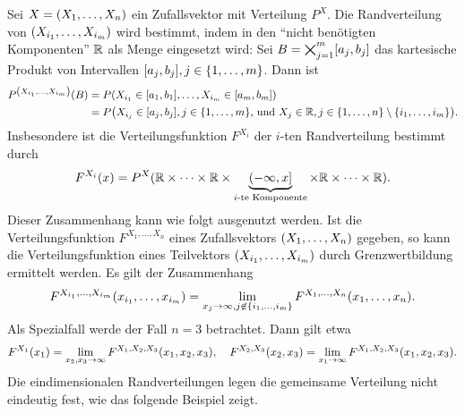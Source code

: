 \documentclass{lecture}
\begin{document}
    Sei \(X = \parentheses*{X_1, \ldots, X_n}\) ein Zufallsvektor mit Verteilung \(P^X\).
    Die Randverteilung von \(\parentheses*{X_{i_1}, \ldots, X_{i_m}}\) wird bestimmt, indem in den ``nicht benötigten Komponenten'' \(\R\) als Menge eingesetzt wird:
    Sei \(B = \bigtimes_{j = 1}^m \brackets*{a_j, b_j}\) das kartesische Produkt von Intervallen \(\brackets*{a_j, b_j}, j \in \braces*{1, \ldots, m}\).
    Dann ist
    \begin{align*}
        P^{\parentheses*{X_{i_1}, \ldots, X_{i_m}}}\parentheses*{B} &= P\parentheses*{X_{i_1} \in \brackets*{a_1, b_1}, \ldots, X_{i_m} \in \brackets*{a_m, b_m}}\\
        &= P\parentheses*{X_{i_j} \in \brackets*{a_j, b_j}, j \in \braces*{1, \ldots, m}\text{, und }X_j \in \R, j \in \braces*{1, \ldots, n} \setminus \braces*{i_1, \ldots, i_m}}.
    \end{align*}
    Insbesondere ist die Verteilungsfunktion \(F^{X_i}\) der \(i\)-ten Randverteilung bestimmt durch
    \[
        F^{X_i}\parentheses*{x} = P^X(\R \times \cdots \times \R \times \underbrace{\left(-\infty, x\right]}_{i\text{-te Komponente}} \times \R \times \cdots \times \R).
    \]
    Dieser Zusammenhang kann wie folgt ausgenutzt werden.
    Ist die Verteilungsfunktion \(F^{X_1, \ldots, X_n}\) eines Zufallsvektors \(\parentheses*{X_1, \ldots, X_n}\) gegeben, so kann die Verteilungsfunktion eines Teilvektors \(\parentheses*{X_{i_1}, \ldots, X_{i_m}}\) durch Grenzwertbildung ermittelt werden.
    Es gilt der Zusammenhang
    \[
        F^{X_{i_1}, \ldots, X_{i_m}}\parentheses*{x_{i_1}, \ldots, x_{i_m}} = \lim_{x_j \to \infty, j \not\in \braces*{i_1, \ldots, i_m}}F^{X_1, \ldots, X_n}\parentheses*{x_1, \ldots, x_n}.
    \]
    Als Spezialfall werde der Fall \(n = 3\) betrachtet.
    Dann gilt etwa
    \[
        F^{X_1}\parentheses*{x_1} = \lim_{x_2, x_3 \to \infty}F^{X_1, X_2, X_3}\parentheses*{x_1, x_2, x_3}, \quad F^{X_2, X_3}\parentheses*{x_2, x_3} = \lim_{x_1 \to \infty}F^{X_1, X_2, X_3}\parentheses*{x_1, x_2, x_3}.
    \]
    Die eindimensionalen Randverteilungen legen die gemeinsame Verteilung nicht eindeutig fest, wie das folgende Beispiel zeigt.
\end{document}
